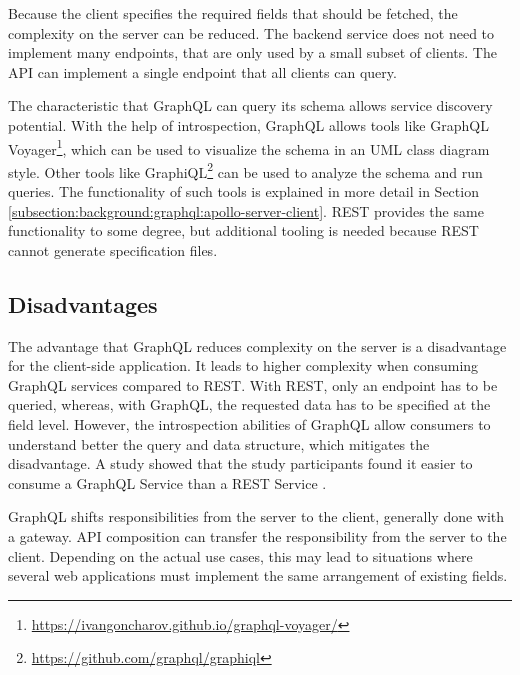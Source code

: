 \bigskip

\noindent Because the client specifies the required fields that should be fetched, the complexity on the server can be reduced. The backend service does not need to implement many endpoints, that are only used by a small subset of clients. The \ac{API} can implement a single endpoint that all clients can query. \cite{book:2018:richardson:background:bff:microservices-patterns}

\bigskip

\noindent The characteristic that GraphQL can query its schema allows service discovery potential. With the help of introspection, GraphQL allows tools like GraphQL Voyager\footnote{\url{https://ivangoncharov.github.io/graphql-voyager/}}, which can be used to visualize the schema in an \ac{UML} class diagram style. Other tools like GraphiQL\footnote{\url{https://github.com/graphql/graphiql}} can be used to analyze the schema and run queries. The functionality of such tools is explained in more detail in Section \ref{subsection:background:graphql:apollo-server-client}. \ac{REST} provides the same functionality to some degree, but additional tooling is needed because \ac{REST} cannot generate specification files.

\subsection{Disadvantages}\label{subsection:background:graphql:graphql-disadvantages}

\noindent The advantage that GraphQL reduces complexity on the server is a disadvantage for the client-side application. It leads to higher complexity when consuming GraphQL services compared to \ac{REST}. With \ac{REST}, only an endpoint has to be queried, whereas, with GraphQL, the requested data has to be specified at the field level. However, the introspection abilities of GraphQL allow consumers to understand better the query and data structure, which mitigates the disadvantage. A study \cite{inproceedings:2020:brito:background:graphql:rest-vs-graphql} showed that the study participants found it easier to consume a GraphQL Service than a \ac{REST} Service \cite{inproceedings:2017:de-pauda:background:graphql:handling-anti-patterns}.

\bigskip

\noindent GraphQL shifts responsibilities from the server to the client, generally done with a gateway. \ac{API} composition can transfer the responsibility from the server to the client. Depending on the actual use cases, this may lead to situations where several web applications must implement the same arrangement of existing fields.

